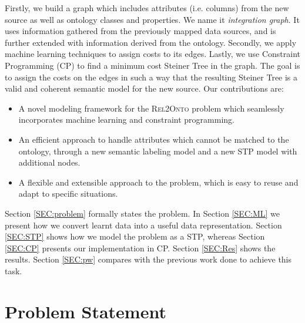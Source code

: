 \documentclass[letterpaper]{article} %
\newcommand{\authornote}[3]{
  {\fbox{\sc 
  #1}:$\blacktriangleright$\textcolor{#2}{\small{#3}}$\blacktriangleleft$}%
}
\newcommand{\npr}[1]{\authornote{NPR}{orange}{#1}}
\newcommand{\relonto}{\textsc{Rel2Onto}}
\begin{document}
Firstly, we build a graph which includes attributes (i.e. columns) from the new
source as well as ontology classes and properties.
We name it \emph{integration graph}.
It uses information gathered from the previously mapped data sources, and is further extended with information derived from the ontology.
Secondly, we apply machine learning techniques to 
assign costs to its edges. 
Lastly, we use Constraint Programming (CP) to 
find a minimum cost Steiner Tree in the graph.
The goal is to assign the costs on the edges in such a way that the resulting 
Steiner Tree is a valid and coherent semantic model for the new source. 
Our contributions are:
\begin{itemize}
	\item A novel modeling framework for the \relonto{} problem which 
	seamlessly incorporates machine learning and constraint programming.
	\item An efficient approach to handle attributes which cannot be matched to 
	the ontology, through a new semantic labeling model and a new STP 
	model with additional nodes.
	\item A flexible and extensible approach to the problem, which is easy to 
	reuse and adapt to specific situations.
\end{itemize}


Section \ref{SEC:problem} formally states the problem. 
In Section \ref{SEC:ML} we present how we convert learnt data into a 
useful data representation. 
Section \ref{SEC:STP} shows how we model the problem as a STP, 
whereas Section \ref{SEC:CP} presents our implementation in CP. 
Section \ref{SEC:Res} shows the results. 
Section \ref{SEC:pw} compares with the previous work done to achieve this task. 

\section{Problem Statement \label{SEC:problem}}
\end{document}
